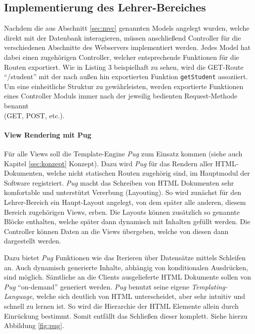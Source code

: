  \subsection{Implementierung des Lehrer-Bereiches}\label{sec:implementlehrer}
 Nachdem die aus Abschnitt \ref{sec:mvc} genannten Models angelegt wurden, welche direkt mit der Datenbank interagieren, müssen anschließend Controller für die verschiedenen Abschnitte des Webservers implementiert werden. Jedes Model hat dabei einen zugehörigen Controller, welcher entsprechende Funktionen für die Routen exportiert. Wie in Listing 3 beispielhaft zu sehen, wird die GET-Route "`/student"' mit der nach außen hin exportierten Funktion \texttt{getStudent} assoziiert. Um eine einheitliche Struktur zu gewährleisten, werden exportierte Funktionen eines Controller Moduls immer nach der jeweilig bedienten Request-Methode benannt \\(GET, POST, etc.).
 \newpage
 \paragraph{View Rendering mit Pug}
Für alle Views soll die Template-Engine \emph{Pug} zum Einsatz kommen (siehe auch Kapitel \ref{sec:konzept} Konzept). Dazu wird \emph{Pug} für das Rendern aller HTML-Dokumenten, welche nicht statischen Routen zugehörig sind, im Hauptmodul der Software registriert. \emph{Pug} macht das Schreiben von HTML Dokumenten sehr komfortable und unterstützt Vererbung (Layouting). So wird zunächst für den Lehrer-Bereich ein Haupt-Layout angelegt, von dem später alle anderen, diesem Bereich zugehörigen Views, erben. Die Layouts können zusätzlich so genannte Blöcke enthalten, welche später dann dynamisch mit Inhalten gefüllt werden. Die Controller können Daten an die Views übergeben, welche von diesen dann dargestellt werden. 

Dazu bietet \emph{Pug }Funktionen wie das Iterieren über Datensätze mittels Schleifen an. Auch dynamisch generierte Inhalte, abhängig von konditionalen Ausdrücken, sind möglich. Sämtliche an die Clients ausgelieferte HTML Dokumente sollen von \emph{Pug} "`on-demand"' generiert werden. \emph{Pug} benutzt seine eigene \emph{Templating-Language}, welche sich deutlich von HTML unterscheidet, aber sehr intuitiv und schnell zu lernen ist. So wird die Hierarchie der HTML Elemente allein durch Einrückung bestimmt. Somit entfällt das Schließen dieser komplett. Siehe hierzu Abbildung \ref{fig:pug}. \\

